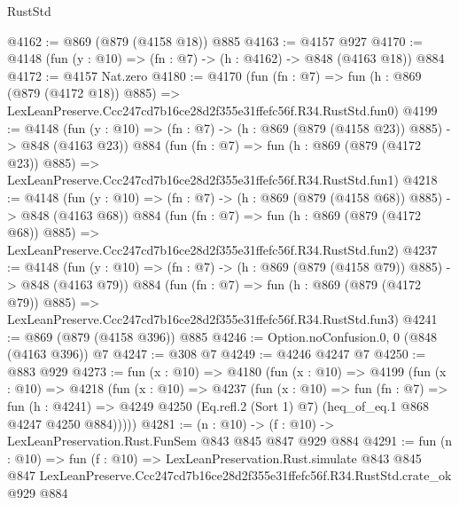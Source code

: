 \begin{lexlean}{RustStd}
\begin{coremodule}
@4162 := @869 (@879 (@4158 @18)) @885
@4163 := @4157 @927
@4170 := @4148 (fun (y : @10) => (fn : @7) -> (h : @4162) -> @848 (@4163 @18)) @884
@4172 := @4157 Nat.zero
@4180 := @4170
    (fun (fn : @7) =>
    fun (h : @869 (@879 (@4172 @18)) @885) =>
    LexLeanPreserve.Ccc247cd7b16ce28d2f355e31ffefc56f.R34.RustStd.fun0)
@4199 := @4148
    (fun (y : @10) => (fn : @7) -> (h : @869 (@879 (@4158 @23)) @885) -> @848 (@4163 @23))
    @884
    (fun (fn : @7) =>
    fun (h : @869 (@879 (@4172 @23)) @885) =>
    LexLeanPreserve.Ccc247cd7b16ce28d2f355e31ffefc56f.R34.RustStd.fun1)
@4218 := @4148
    (fun (y : @10) => (fn : @7) -> (h : @869 (@879 (@4158 @68)) @885) -> @848 (@4163 @68))
    @884
    (fun (fn : @7) =>
    fun (h : @869 (@879 (@4172 @68)) @885) =>
    LexLeanPreserve.Ccc247cd7b16ce28d2f355e31ffefc56f.R34.RustStd.fun2)
@4237 := @4148
    (fun (y : @10) => (fn : @7) -> (h : @869 (@879 (@4158 @79)) @885) -> @848 (@4163 @79))
    @884
    (fun (fn : @7) =>
    fun (h : @869 (@879 (@4172 @79)) @885) =>
    LexLeanPreserve.Ccc247cd7b16ce28d2f355e31ffefc56f.R34.RustStd.fun3)
@4241 := @869 (@879 (@4158 @396)) @885
@4246 := Option.noConfusion.{0, 0} (@848 (@4163 @396)) @7
@4247 := @308 @7
@4249 := @4246 @4247 @7
@4250 := @883 @929
@4273 := fun (x : @10) =>
  @4180
    (fun (x : @10) =>
    @4199
      (fun (x : @10) =>
      @4218
        (fun (x : @10) =>
        @4237
          (fun (x : @10) =>
          fun (fn : @7) =>
          fun (h : @4241) =>
          @4249 @4250 (Eq.refl.{2} (Sort 1) @7) (heq_of_eq.{1} @868 @4247 @4250 @884)))))
@4281 := (n : @10) -> (f : @10) -> LexLeanPreservation.Rust.FunSem @843 @845 @847 @929 @884
@4291 := fun (n : @10) =>
  fun (f : @10) =>
  LexLeanPreservation.Rust.simulate
    @843
    @845
    @847
    LexLeanPreserve.Ccc247cd7b16ce28d2f355e31ffefc56f.R34.RustStd.crate_ok
    @929
    @884
\end{coremodule}
\end{lexlean}
